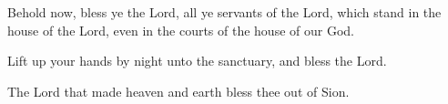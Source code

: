 Behold now, bless ye the Lord, all ye servants of the Lord, which stand in the house of the Lord, even in the courts of the house of our God.

Lift up your hands by night unto the sanctuary, and bless the Lord.

The Lord that made heaven and earth bless thee out of Sion.
